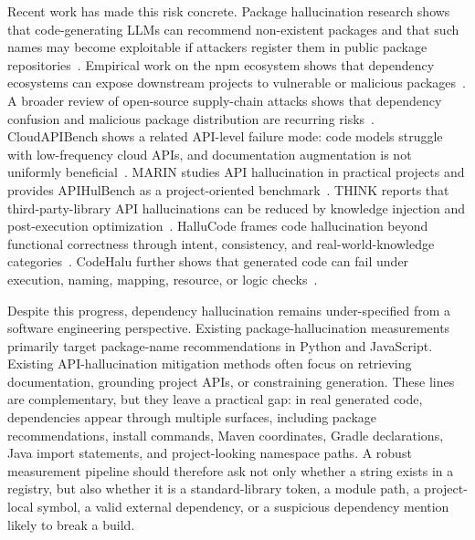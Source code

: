 \documentclass[pdflatex,sn-basic]{sn-jnl}
\begin{document}
Recent work has made this risk concrete. Package hallucination research shows that code-generating LLMs can recommend non-existent packages and that such names may become exploitable if attackers register them in public package repositories~\citep{Spracklen2025}. Empirical work on the npm ecosystem shows that dependency ecosystems can expose downstream projects to vulnerable or malicious packages~\citep{Zimmermann2019NPM}. A broader review of open-source supply-chain attacks shows that dependency confusion and malicious package distribution are recurring risks~\citep{Ohm2020Backstabber}. CloudAPIBench shows a related API-level failure mode: code models struggle with low-frequency cloud APIs, and documentation augmentation is not uniformly beneficial~\citep{Jain2024}. MARIN studies API hallucination in practical projects and provides APIHulBench as a project-oriented benchmark~\citep{Chen2025MARIN}. THINK reports that third-party-library API hallucinations can be reduced by knowledge injection and post-execution optimization~\citep{Liu2025THINK}. HalluCode frames code hallucination beyond functional correctness through intent, consistency, and real-world-knowledge categories~\citep{Liu2024HalluCode}. CodeHalu further shows that generated code can fail under execution, naming, mapping, resource, or logic checks~\citep{Tian2025CodeHalu}.

Despite this progress, dependency hallucination remains under-specified from a software engineering perspective. Existing package-hallucination measurements primarily target package-name recommendations in Python and JavaScript. Existing API-hallucination mitigation methods often focus on retrieving documentation, grounding project APIs, or constraining generation. These lines are complementary, but they leave a practical gap: in real generated code, dependencies appear through multiple surfaces, including package recommendations, install commands, Maven coordinates, Gradle declarations, Java import statements, and project-looking namespace paths. A robust measurement pipeline should therefore ask not only whether a string exists in a registry, but also whether it is a standard-library token, a module path, a project-local symbol, a valid external dependency, or a suspicious dependency mention likely to break a build.
\end{document}
